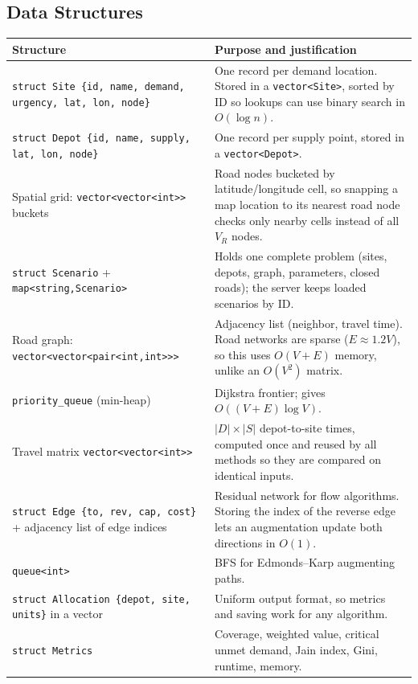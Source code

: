 \documentclass[11pt]{article}
\begin{document}
\subsection{Data Structures}
{\small
\begin{xltabular}{\textwidth}{@{}>{\raggedright\arraybackslash}p{0.36\textwidth} X@{}}
\toprule
\textbf{Structure} & \textbf{Purpose and justification}\\
\midrule
\endhead
\texttt{struct Site \{id, name, demand, urgency, lat, lon, node\}} &
  One record per demand location. Stored in a \texttt{vector<Site>}, sorted
  by ID so lookups can use binary search in $O(\log n)$.\\
\texttt{struct Depot \{id, name, supply, lat, lon, node\}} &
  One record per supply point, stored in a \texttt{vector<Depot>}.\\
Spatial grid: \texttt{vector<vector<int>>} buckets &
  Road nodes bucketed by latitude/longitude cell, so snapping a map location
  to its nearest road node checks only nearby cells instead of all $V_R$
  nodes.\\
\texttt{struct Scenario} + \texttt{map<string,Scenario>} &
  Holds one complete problem (sites, depots, graph, parameters, closed
  roads); the server keeps loaded scenarios by ID.\\
Road graph: \texttt{vector<vector<pair<int,int>>>} &
  Adjacency list (neighbor, travel time). Road networks are sparse
  ($E \approx 1.2V$), so this uses $O(V+E)$ memory, unlike an
  $O(V^2)$ matrix.\\
\texttt{priority\_queue} (min-heap) &
  Dijkstra frontier; gives $O((V+E)\log V)$.\\
Travel matrix \texttt{vector<vector<int>>} &
  $|D|\times|S|$ depot-to-site times, computed once and reused by all
  methods so they are compared on identical inputs.\\
\texttt{struct Edge \{to, rev, cap, cost\}} + adjacency list of edge indices &
  Residual network for flow algorithms. Storing the index of the reverse
  edge lets an augmentation update both directions in $O(1)$.\\
\texttt{queue<int>} &
  BFS for Edmonds--Karp augmenting paths.\\
\texttt{struct Allocation \{depot, site, units\}} in a vector &
  Uniform output format, so metrics and saving work for any algorithm.\\
\texttt{struct Metrics} &
  Coverage, weighted value, critical unmet demand, Jain index, Gini,
  runtime, memory.\\
\bottomrule
\end{xltabular}}
\end{document}
